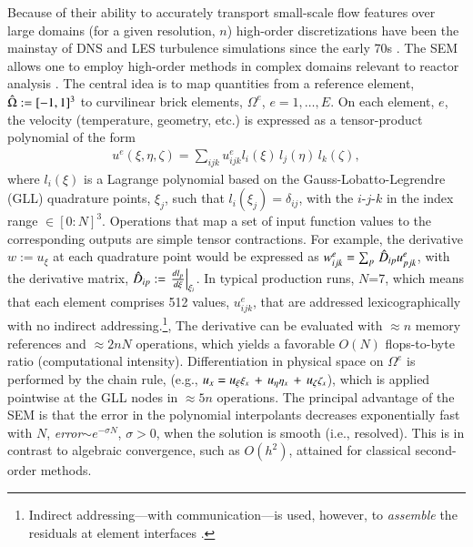 Because of their ability to accurately transport small-scale flow features over
large domains (for a given resolution, $n$) high-order discretizations have
been the mainstay of DNS and LES turbulence simulations since the early 70s 
\cite{kreiss72,sao72}.   The SEM allows one to employ high-order methods in 
complex domains relevant to reactor analysis  \cite{pat84,sao80}.   
The central idea is to map
quantities from a reference element, ${\hat \Omega}:=[-1,1]^3$ to curvilinear brick
elements, $\Omega^e$, $e=1,\dots,E$.  On each element, $e$, the velocity
(temperature, geometry, etc.) is expressed as a tensor-product polynomial
of the form
\begin{eqnarray}
  u^e(\xi,\eta,\zeta) = \sum_{ijk} u_{ijk}^e l_i(\xi) \, l_j(\eta) \, l_k(\zeta),
\end{eqnarray}
where $l_i(\xi)$ is a Lagrange polynomial based on the Gauss-Lobatto-Legrendre
(GLL) quadrature points, $\xi_j$, such that $l_i(\xi_j)=\delta_{ij}$, with the
$i$-$j$-$k$ in the index range $\in [0:N]^3$.  Operations that map a set of input
function values to the corresponding outputs are simple tensor contractions.
For example, the derivative $w := u_{\xi}$ at each quadrature point would be
expressed as $w^e_{ijk} = \sum_p \, {\hat D}_{ip} u_{pjk}^e$, with the derivative
matrix, ${\hat D}_{ip} := \left. \frac{d l_p}{d \xi} \right|_{\xi_i}$.   
In typical production runs, $N$=7, which means that each element comprises 512
values, $u_{ijk}^e$, that are addressed lexicographically with no indirect
addressing.\footnote{Indirect addressing---with communication---is used,
however, to {\em assemble} the residuals at element interfaces \cite{dfm02}.},
The derivative can be evaluated with $\approx n$ memory references and
$\approx 2nN$ operations, which yields a favorable $O(N)$ flops-to-byte ratio 
(computational intensity).
Differentiation in physical space on $\Omega^e$ is performed by the chain rule, 
(e.g., $u_x = 
u_{\xi}   \mbox{\footnotesize $\xi_x$}    \,+\, 
u_{\eta}  \mbox{\footnotesize $\eta_x$}   \,+\, 
u_{\zeta} \mbox{\footnotesize $\zeta_x$}  $), 
which is applied pointwise at the GLL nodes in $\approx 5n$ operations.  
The principal advantage of the SEM is that the error in the polynomial
interpolants decreases exponentially fast with $N$, {\em error}$\sim e^{-\sigma
N}$, $\sigma > 0$, when the solution is smooth (i.e., resolved).
This is in contrast to algebraic convergence, such as $O(h^2)$, attained
for classical second-order methods.




